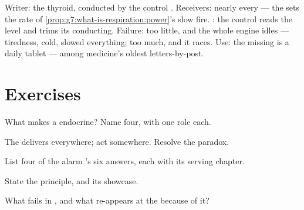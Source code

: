 \begin{example}\label{ex:g8:hormonal-communication:thyroid}
Writer: the thyroid, conducted by the control .
Receivers: nearly every  --- the  sets the
rate of \cref{prop:g7:what-is-respiration:power}'s slow
fire. : the control  reads the level and
trims its conducting. Failure: too little, and the whole
engine idles --- tiredness, cold, slowed everything; too
much, and it races. Use: the missing  is a daily
tablet --- among medicine's oldest letters-by-post.
\end{example}

\section{Exercises}

\begin{exercise}[$\star$]\label{exo:g8:hormonal-communication:1}
What makes a  endocrine? Name four, with one
 role each.
\end{exercise}

\begin{exercise}[$\star$]\label{exo:g8:hormonal-communication:2}
The  delivers everywhere;  act somewhere.
Resolve the paradox.
\end{exercise}

\begin{exercise}[$\star$]\label{exo:g8:hormonal-communication:3}
List four of the alarm 's six answers, each with
its serving chapter.
\end{exercise}

\begin{exercise}[$\star$]\label{exo:g8:hormonal-communication:4}
State the  principle, and its showcase.
\end{exercise}

\begin{exercise}[$\star$]\label{exo:g8:hormonal-communication:5}
What fails in , and what re-appears at the
 because of it?
\end{exercise}

